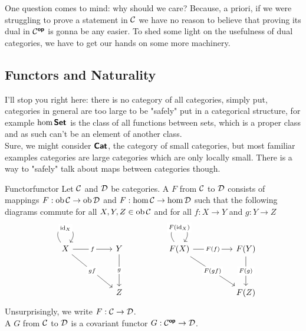 \documentclass{article}
\begin{document}
One question comes to mind: why should we care? Because, a priori, if we were struggling to prove a statement in $\mathcal{C}$ we have no reason to believe that proving its dual in $\mathcal{C}^{\text{\sffamily\textbf{op}}}$ is gonna be any easier. To shed some light on the usefulness of dual categories, we have to get our hands on some more machinery.

\subsection{Functors and Naturality}


I'll stop you right here: there is no category of all categories, simply put, categories in general are too large to be "safely" put in a categorical structure, for example $\hom\text{\sffamily\textbf{Set}}$ is the class of all functions between sets, which is a proper class and as such can't be an element of another class.\\
Sure, we might consider $\text{\sffamily\textbf{Cat}}$, the category of small categories, but most familiar examples categories are large categories which are only locally small. There is a way to "safely" talk about maps between categories though.

\begin{definition}{Functor}{functor}
    Let $\mathcal{C}$ and $\mathcal{D}$ be categories. A  $F$ from $\mathcal{C}$ to $\mathcal{D}$ consists of mappings $F:\operatorname{ob}\mathcal{C}\to\operatorname{ob}\mathcal{D}$ and $F:\hom\mathcal{C}\to\hom\mathcal{D}$ such that the following diagrams commute for all $X,Y,Z \in \operatorname{ob}\mathcal{C}$ and for all $f: X\to Y$ and $g: Y\to Z$
    \[\begin{tikzcd}
	    X && Y && {F(X)} && {F(Y)} \\
	    \\
	    && Z &&&& {F(Z)}
	    \arrow["{\id_X}"{description}, from=1-1, to=1-1, loop, in=55, out=125, distance=10mm]
	    \arrow["f"{description}, from=1-1, to=1-3]
	    \arrow["gf"{description}, from=1-1, to=3-3]
	    \arrow["g"{description}, from=1-3, to=3-3]
	    \arrow["{F(\id_X)}"{description}, from=1-5, to=1-5, loop, in=55, out=125, distance=10mm]
	    \arrow["{F(f)}"{description}, from=1-5, to=1-7]
	    \arrow["{F(gf)}"{description}, from=1-5, to=3-7]
	    \arrow["{F(g)}"{description}, from=1-7, to=3-7]
    \end{tikzcd}\]
    Unsurprisingly, we write $F : \mathcal{C}\to \mathcal{D}$.\\
    A  $G$ from $\mathcal{C}$ to $\mathcal{D}$ is a covariant functor $G : \mathcal{C}^{\text{\sffamily\textbf{op}}} \to \mathcal{D}$.
\end{definition}
\end{document}
